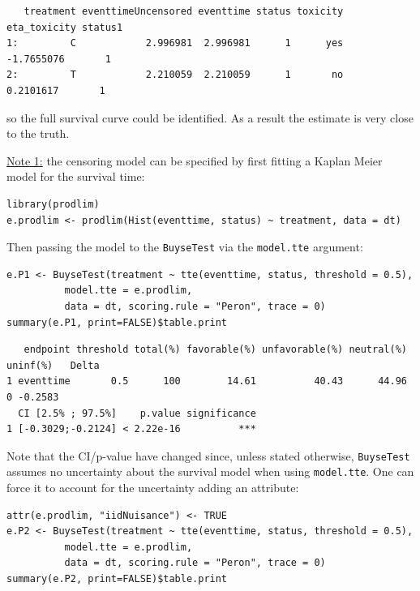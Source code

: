 \documentclass[12pt]{article}
\begin{document}
\begin{verbatim}
   treatment eventtimeUncensored eventtime status toxicity eta_toxicity status1
1:         C            2.996981  2.996981      1      yes   -1.7655076       1
2:         T            2.210059  2.210059      1       no    0.2101617       1
\end{verbatim}

so the full survival curve could be identified. As a result the estimate is very close to the
truth. 

\bigskip

\uline{Note 1:} the censoring model can be specified by first fitting a
Kaplan Meier model for the survival time:
\lstset{language=r,label= ,caption= ,captionpos=b,numbers=none}
\begin{lstlisting}
library(prodlim)
e.prodlim <- prodlim(Hist(eventtime, status) ~ treatment, data = dt)
\end{lstlisting}

Then passing the model to the \texttt{BuyseTest} via the \texttt{model.tte} argument:
\lstset{language=r,label= ,caption= ,captionpos=b,numbers=none}
\begin{lstlisting}
e.P1 <- BuyseTest(treatment ~ tte(eventtime, status, threshold = 0.5),
		  model.tte = e.prodlim,
		  data = dt, scoring.rule = "Peron", trace = 0)
summary(e.P1, print=FALSE)$table.print
\end{lstlisting}

\begin{verbatim}
   endpoint threshold total(%) favorable(%) unfavorable(%) neutral(%) uninf(%)   Delta
1 eventtime       0.5      100        14.61          40.43      44.96        0 -0.2583
  CI [2.5% ; 97.5%]    p.value significance
1 [-0.3029;-0.2124] < 2.22e-16          ***
\end{verbatim}


Note that the CI/p-value have changed since, unless stated otherwise,
\texttt{BuyseTest} assumes no uncertainty about the survival model when using
\texttt{model.tte}. One can force it to account for the uncertainty adding an attribute:
\lstset{language=r,label= ,caption= ,captionpos=b,numbers=none}
\begin{lstlisting}
attr(e.prodlim, "iidNuisance") <- TRUE
e.P2 <- BuyseTest(treatment ~ tte(eventtime, status, threshold = 0.5),
		  model.tte = e.prodlim,
		  data = dt, scoring.rule = "Peron", trace = 0)
summary(e.P2, print=FALSE)$table.print
\end{lstlisting}
\end{document}
